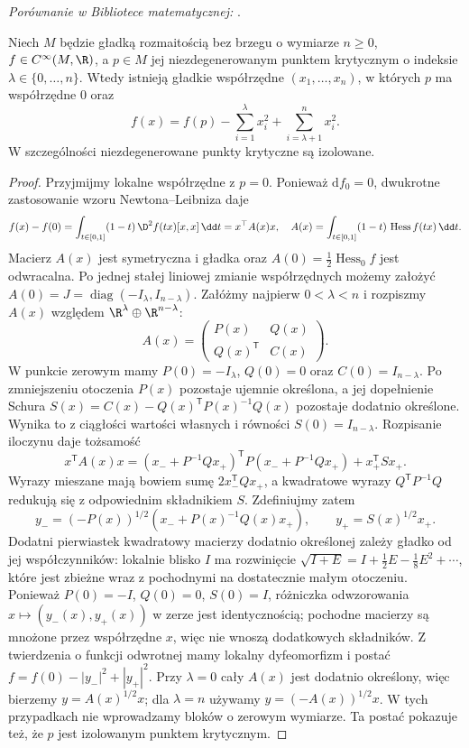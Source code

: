 \noindent\emph{Porównanie w Bibliotece matematycznej:} .

\begin{twierdzenie}
\label{thm:morse-lemma-v10}
Niech $M$ będzie gładką rozmaitością bez brzegu o wymiarze $n\ge0$,
$f\in C^\infty(M,\R)$, a $p\in M$ jej niezdegenerowanym punktem
krytycznym o indeksie $\lambda\in\{0,\ldots,n\}$. Wtedy istnieją
gładkie współrzędne $(x_1,\ldots,x_n)$, w których
$p$ ma współrzędne $0$ oraz
\[
 f(x)=f(p)-\sum_{i=1}^{\lambda}x_i^2+
                \sum_{i=\lambda+1}^{n}x_i^2.
\]
W szczególności niezdegenerowane punkty krytyczne są izolowane.
\end{twierdzenie}
\begin{proof}
Przyjmijmy lokalne współrzędne z $p=0$. Ponieważ
$\mathrm df_0=0$, dwukrotne zastosowanie wzoru Newtona--Leibniza daje
\[
f(x)-f(0)=\int_{t\in[0,1]}(1-t)\,\D^2f(tx)[x,x] \,\dd t
=x^\top A(x)x,
\quad A(x)=\int_{t\in[0,1]}(1-t)\,\operatorname{Hess}f(tx)\,\dd t.
\]
Macierz $A(x)$ jest symetryczna i gładka oraz
$A(0)=\tfrac12\operatorname{Hess}_0f$ jest odwracalna.
Po jednej stałej liniowej zmianie współrzędnych
możemy założyć $A(0)=J=\operatorname{diag}(-I_\lambda,I_{n-\lambda})$.
Załóżmy najpierw $0<\lambda<n$ i rozpiszmy
$A(x)$ względem $\R^\lambda\oplus\R^{n-\lambda}$:
\[
 A(x)=\begin{pmatrix}P(x)&Q(x)\\ Q(x)^{\mathsf T}&C(x)\end{pmatrix}.
\]
W punkcie zerowym mamy $P(0)=-I_\lambda$,
$Q(0)=0$ oraz $C(0)=I_{n-\lambda}$.
Po zmniejszeniu otoczenia $P(x)$ pozostaje ujemnie
określona, a jej dopełnienie Schura
$S(x)=C(x)-Q(x)^{\mathsf T}P(x)^{-1}Q(x)$
pozostaje dodatnio określone. Wynika to z ciągłości
wartości własnych i równości $S(0)=I_{n-\lambda}$.
Rozpisanie iloczynu daje tożsamość
\[
 x^{\mathsf T}A(x)x=
 (x_-+P^{-1}Qx_+)^{\mathsf T}P(x_-+P^{-1}Qx_+)
 +x_+^{\mathsf T}Sx_+.
\]
Wyrazy mieszane mają bowiem sumę $2x_-^{\mathsf T}Qx_+$,
a kwadratowe wyrazy $Q^{\mathsf T}P^{-1}Q$ redukują się
z odpowiednim składnikiem $S$.
Zdefiniujmy zatem
\[
 y_-=(-P(x))^{1/2}(x_-+P(x)^{-1}Q(x)x_+),\qquad
 y_+=S(x)^{1/2}x_+.
\]
Dodatni pierwiastek kwadratowy macierzy dodatnio określonej
zależy gładko od jej współczynników: lokalnie blisko
$I$ ma rozwinięcie $\sqrt{I+E}=I+\tfrac12E-\tfrac18E^2+\cdots$,
które jest zbieżne wraz z pochodnymi na dostatecznie
małym otoczeniu. Ponieważ $P(0)=-I$, $Q(0)=0$,
$S(0)=I$, różniczka odwzorowania
$x\mapsto(y_-(x),y_+(x))$ w zerze jest identycznością;
pochodne macierzy są mnożone przez współrzędne $x$,
więc nie wnoszą dodatkowych składników. Z twierdzenia
o funkcji odwrotnej mamy lokalny dyfeomorfizm i postać
$f=f(0)-|y_-|^2+|y_+|^2$.
Przy $\lambda=0$ cały $A(x)$ jest dodatnio określony,
więc bierzemy $y=A(x)^{1/2}x$; dla $\lambda=n$
używamy $y=(-A(x))^{1/2}x$. W tych przypadkach
nie wprowadzamy bloków o zerowym wymiarze.
Ta postać pokazuje też, że $p$ jest izolowanym punktem krytycznym.
\end{proof}

